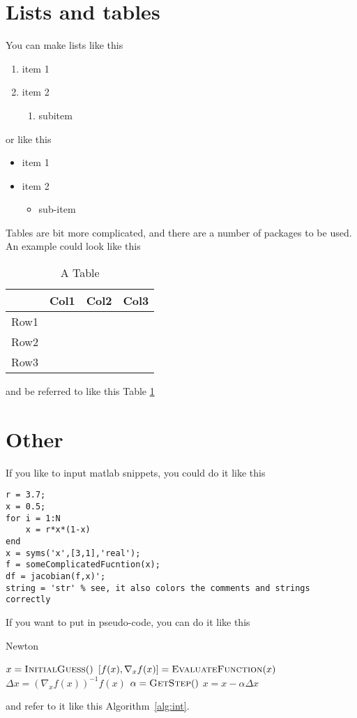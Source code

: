 \documentclass[11pt]{article}
\begin{document}
\section{Lists and tables}
You can make lists like this
\begin{enumerate}
\item item 1
\item item 2
\begin{enumerate}
\item subitem
\end{enumerate}
\end{enumerate}
or like this
\begin{itemize}
\item item 1
\item item 2
\begin{itemize}
\item sub-item
\end{itemize}
\end{itemize}
Tables are bit more complicated, and there are a number of packages to be used. An example could look like this
\begin{table}[h]
\caption{A Table}\label{tab:table}
\begin{center}
\begin{tabular}{|l|c|c|c|}
\hline
 		& Col1 	& Col2 	& Col3 	\\[3pt] \hline
Row1	&  		&  		&  		\\[3pt] \hline
Row2&  		&  		&  		\\[3pt] \hline
Row3	&  		&  		&  		\\[3pt] \hline

\end{tabular}
\end{center}
\end{table}
and be referred to like this Table \ref{tab:table}


\section{Other}
If you like to input matlab snippets, you could do it like this
\begin{lstlisting}
r = 3.7;
x = 0.5;
for i = 1:N
	x = r*x*(1-x)
end
x = syms('x',[3,1],'real');
f = someComplicatedFucntion(x);
df = jacobian(f,x)';
string = 'str' % see, it also colors the comments and strings correctly
\end{lstlisting}
If you want to put in pseudo-code, you can do it like this
\begin{algorithm}
\caption{Newton}\label{alg:int}
\begin{algorithmic}[1]
\State $x=\textsc{InitialGuess}()$
\State $[f(x), \nabla_x f(x) ] = \textsc{EvaluateFunction}(x)$
\State $\Delta x = \left(\nabla_x f(x) \right)^{-1}f(x)$
\State $\alpha = \textsc{GetStep}()$
\State $x = x-\alpha \Delta x$
\EndWhile
{}
\EndProcedure
\end{algorithmic}
\end{algorithm}
and refer to it like this Algorithm~\ref{alg:int}.
\end{document}

